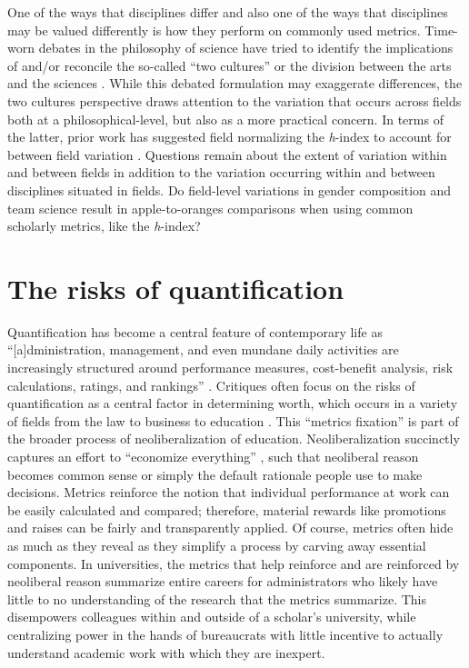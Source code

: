 \documentclass[
  10pt,
  letterpaper,
]{article}
\begin{document}
One of the ways that disciplines differ and also one of the ways that
disciplines may be valued differently is how they perform on commonly
used metrics. Time-worn debates in the philosophy of science have tried
to identify the implications of and/or reconcile the so-called ``two
cultures'' or the division between the arts and the sciences
\citep{snow_two_2012}. While this debated formulation may exaggerate
differences, the two cultures perspective draws attention to the
variation that occurs across fields both at a philosophical-level, but
also as a more practical concern. In terms of the latter, prior work has
suggested field normalizing the \emph{h}-index to account for between
field variation \citep{bi_four_2023}. Questions remain about the extent
of variation within and between fields in addition to the variation
occurring within and between disciplines situated in fields. Do
field-level variations in gender composition and team science result in
apple-to-oranges comparisons when using common scholarly metrics, like
the \emph{h}-index?

\hypertarget{the-risks-of-quantification}{%
\section{The risks of
quantification}\label{the-risks-of-quantification}}

Quantification has become a central feature of contemporary life as
``{[}a{]}dministration, management, and even mundane daily activities
are increasingly structured around performance measures, cost-benefit
analysis, risk calculations, ratings, and rankings''
\citep[p.~224]{mennicken_what_2019}. Critiques often focus on the risks
of quantification as a central factor in determining worth, which occurs
in a variety of fields from the law to business to education
\citep[p.~4]{muller_tyranny_2019}. This ``metrics fixation'' is part of
the broader process of neoliberalization of education. Neoliberalization
succinctly captures an effort to ``economize everything''
\citep[p.~171]{berg_producing_2016}, such that neoliberal reason becomes
common sense or simply the default rationale people use to make
decisions. Metrics reinforce the notion that individual performance at
work can be easily calculated and compared; therefore, material rewards
like promotions and raises can be fairly and transparently applied. Of
course, metrics often hide as much as they reveal as they simplify a
process by carving away essential components. In universities, the
metrics that help reinforce and are reinforced by neoliberal reason
summarize entire careers for administrators who likely have little to no
understanding of the research that the metrics summarize. This
disempowers colleagues within and outside of a scholar's university,
while centralizing power in the hands of bureaucrats with little
incentive to actually understand academic work with which they are
inexpert.
\end{document}
